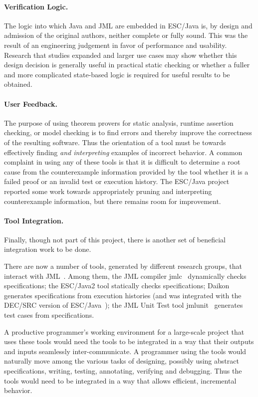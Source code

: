 \documentclass{acm_proc_article-sp}
\begin{document}
\paragraph*{Verification Logic.} The logic into which Java and JML are
embedded in ESC/Java is, by design and admission of the original
authors, neither complete or fully sound.  This was the result of an
engineering judgement in favor of performance and usability.  Research
that studies expanded and larger use cases may show whether this
design decision is generally useful in practical static checking or
whether a fuller and more complicated state-based logic is required
for useful results to be obtained.

\paragraph*{User Feedback.} The purpose of using theorem provers for
static analysis, runtime assertion checking, or model checking is to
find errors and thereby improve the correctness of the resulting
software.  Thus the orientation of a tool must be towards effectively
finding {\em and interpreting} examples of incorrect behavior.  A
common complaint in using any of these tools is that it is difficult
to determine a root cause from the counterexample information provided
by the tool whether it is a failed proof or an invalid test or
execution history.  The ESC/Java project reported some work towards
appropriately pruning and interpreting counterexample information, but
there remains room for improvement.

\paragraph*{Tool Integration.} Finally, though not part of this
project, there is another set of beneficial integration work to be
done.

There are now a number of tools, generated by different research
groups, that interact with JML~\cite{Burdy-etal03}.  Among them, the
JML compiler jmlc~\cite{Cheon-Leavens02b} dynamically checks
specifications; the ESC/Java2 tool statically checks specifications;
Daikon generates specifications from execution histories (and was
integrated with the DEC/SRC version of ESC/Java~\cite{NimmerErnst01});
the JML Unit Test tool jmlunit~\cite{Cheon-Leavens02} generates test
cases from specifications.
 
A productive programmer's working environment for a large-scale
project that uses these tools would need the tools to be integrated in
a way that their outputs and inputs seamlessly inter-communicate.  A
programmer using the tools would naturally move among the various
tasks of designing, possibly using abstract specifications, writing,
testing, annotating, verifying and debugging.  Thus the tools would
need to be integrated in a way that allows efficient, incremental
behavior.
\end{document}
